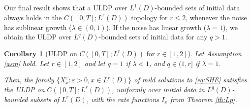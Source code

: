 \documentclass[10pt,a4paper]{amsart}
\newtheorem{corollary}[theorem]{Corollary}
\numberwithin{equation}{section}
\newcommand{\eps}{\varepsilon}
\begin{document}
Our final result shows that a ULDP over $L^1(D)$-bounded sets of initial data always holds  in the  $C([0,T];L^r(D))$ topology for $r\leq 2$, whenever the noise has sublinear growth ($\lambda\in(0,1)$). If the noise has linear growth ($\lambda=1$), we obtain the ULDP over $L^q(D)$-bounded sets of initial data for any $q>1$. 

\begin{corollary}[{ULDP on $C([0,T];L^r(D))$ for $r\in[1,2]$}]\label{cor:Lp p<2}  
Let Assumption \ref{asm} hold. Let $r\in[1,2]$ and let $q=1$ if $\lambda<1$, and $q\in(1,r]$ if $\lambda=1$.   

Then, the family $\{X_x^{\eps}:\eps>0,x\in L^r(D)\}$ of mild solutions to \eqref{eq:SHE}  satisfies the ULDP on $C([0,T];L^r(D))$, uniformly over initial data in $L^q(D)$-bounded subsets of $L^r(D)$,  
with the rate functions $I_x$ from Theorem \ref{th:Lp}. 
\end{corollary} 
\end{document}
